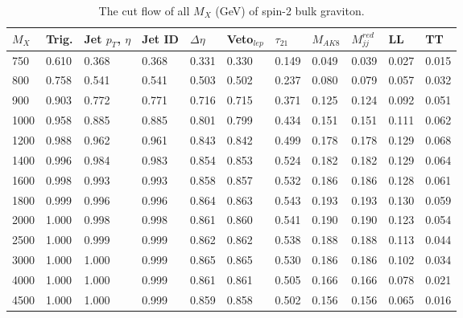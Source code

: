 \begin{table}[h!]
  \begin{center}
    \begin{tabular}{lllllllllll}
    $M_X$ & Trig. & Jet $p_T$, $\eta$ & Jet ID & $\Delta \eta$ & Veto$_{lep}$ & $\tau _{21}$ & $M_{AK8}$ & $M^{red}_{jj}$ & LL & TT\\
    \hline
    750 & 0.610 & 0.368 & 0.368 & 0.331 & 0.330 & 0.149 & 0.049 & 0.039 & 0.027 & 0.015 \\
	800 & 0.758 & 0.541 & 0.541 & 0.503 & 0.502 & 0.237 & 0.080 & 0.079 & 0.057 & 0.032 \\
	900 & 0.903 & 0.772 & 0.771 & 0.716 & 0.715 & 0.371 & 0.125 & 0.124 & 0.092 & 0.051 \\
	1000 & 0.958 & 0.885 & 0.885 & 0.801 & 0.799 & 0.434 & 0.151 & 0.151 & 0.111 & 0.062 \\
1200 & 0.988 & 0.962 & 0.961 & 0.843 & 0.842 & 0.499 & 0.178 & 0.178 & 0.129 & 0.068 \\
1400 & 0.996 & 0.984 & 0.983 & 0.854 & 0.853 & 0.524 & 0.182 & 0.182 & 0.129 & 0.064 \\
1600 & 0.998 & 0.993 & 0.993 & 0.858 & 0.857 & 0.532 & 0.186 & 0.186 & 0.128 & 0.061 \\
1800 & 0.999 & 0.996 & 0.996 & 0.864 & 0.863 & 0.543 & 0.193 & 0.193 & 0.130 & 0.059 \\
2000 & 1.000 & 0.998 & 0.998 & 0.861 & 0.860 & 0.541 & 0.190 & 0.190 & 0.123 & 0.054 \\
2500 & 1.000 & 0.999 & 0.999 & 0.862 & 0.862 & 0.538 & 0.188 & 0.188 & 0.113 & 0.044 \\
3000 & 1.000 & 1.000 & 0.999 & 0.865 & 0.865 & 0.530 & 0.186 & 0.186 & 0.102 & 0.034 \\
4000 & 1.000 & 1.000 & 0.999 & 0.861 & 0.861 & 0.505 & 0.166 & 0.166 & 0.078 & 0.021 \\
4500 & 1.000 & 1.000 & 0.999 & 0.859 & 0.858 & 0.502 & 0.156 & 0.156 & 0.065 & 0.016 \\
\hline
    \end{tabular}
  \end{center}
	
  \caption{The cut flow of all $M_X$ (GeV) of spin-2 bulk graviton.}
\end{table} 

